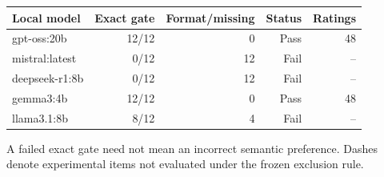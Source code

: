 \begin{center}\small
\begin{tabular}{lrrrr}\toprule
Local model & Exact gate & Format/missing & Status & Ratings \\\midrule
gpt-oss:20b & 12/12 & 0 & Pass & 48 \\
mistral:latest & 0/12 & 12 & Fail & -- \\
deepseek-r1:8b & 0/12 & 12 & Fail & -- \\
gemma3:4b & 12/12 & 0 & Pass & 48 \\
llama3.1:8b & 8/12 & 4 & Fail & -- \\
\bottomrule\end{tabular}
\end{center}
A failed exact gate need not mean an incorrect semantic preference. Dashes denote experimental items not evaluated under the frozen exclusion rule.
